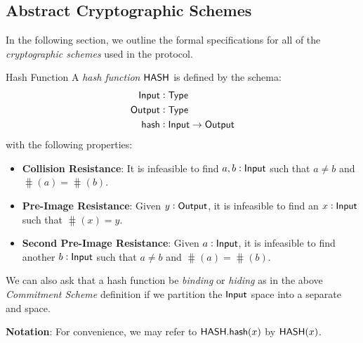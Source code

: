 
\subsection{Abstract Cryptographic Schemes}

In the following section, we outline the formal specifications for all of the \emph{cryptographic schemes} used in the \MantaPay{} protocol.

\begin{definitiontoc}{Hash Function}
    A \emph{hash function} ${\textsf{HASH}}$ is defined by the schema:
    \begin{align*}
        {\textsf{Input}}  &: {\textsf{Type}} \\
        {\textsf{Output}} &: {\textsf{Type}} \\
        {\textsf{hash}}   &: {\textsf{Input}} \to {\textsf{Output}}
    \end{align*}
    with the following properties:
    \begin{itemize}
        \item \textbf{Collision Resistance}: It is infeasible to find $a, b : {\textsf{Input}}$ such that $a \ne b$ and $\hash(a) = \hash(b)$.
        \item \textbf{Pre-Image Resistance}: Given $y : {\textsf{Output}}$, it is infeasible to find an $x : {\textsf{Input}}$ such that $\hash(x) = y$.
        \item \textbf{Second Pre-Image Resistance}: Given $a : {\textsf{Input}}$, it is infeasible to find another $b : {\textsf{Input}}$ such that $a \ne b$ and $\hash(a) = \hash(b)$.
    \end{itemize}

    We can also ask that a hash function be \emph{binding} or \emph{hiding} as in the above \emph{Commitment Scheme} definition if we partition the ${\textsf{Input}}$ space into a separate \Randomness{} and \Input{} space.

    \textbf{Notation}: For convenience, we may refer to ${\textsf{HASH}}.{\textsf{hash}}(x)$ by ${\textsf{HASH}}(x)$.
\end{definitiontoc}

